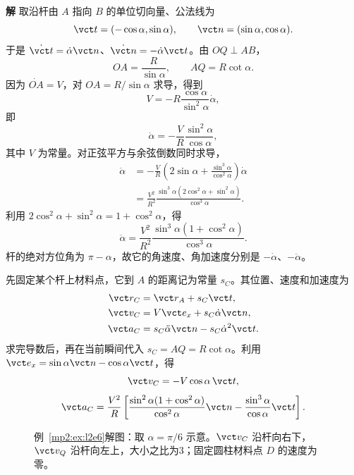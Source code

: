 \documentclass[11pt,openany,fontset=fandol]{ctexbook}
\theoremstyle{definition}\newtheorem{example}{例}[chapter]\newtheorem{exercise}{习题}[chapter]
\newcommand{\SolutionStart}{\par\medskip\ifdim\pagetotal>0pt\ifdim\dimexpr\pagegoal-\pagetotal\relax<3\baselineskip\newpage\fi\fi\noindent\textbf{解}\quad\ignorespaces}
\newenvironment{solution}{\SolutionStart}{\par\medskip}
\begin{document}
\begin{solution}
取沿杆由 $A$ 指向 $B$ 的单位切向量、公法线为
\[
\vct t=(-\cos\alpha,\sin\alpha),\qquad
\vct n=(\sin\alpha,\cos\alpha).
\]
于是 $\dot{\vct t}=\dot\alpha\vct n$、$\dot{\vct n}=-\dot\alpha\vct t$。由 $OQ\perp AB$，
\[
OA=\frac R{\sin\alpha},\qquad AQ=R\cot\alpha.
\]
因为 $\dot{OA}=V$，对 $OA=R/\sin\alpha$ 求导，得到
\[
V=-R\frac{\cos\alpha}{\sin^2\alpha}\dot\alpha,
\]
即
\[
\dot\alpha=-\frac VR\frac{\sin^2\alpha}{\cos\alpha},
\]
其中 $V$ 为常量。对正弦平方与余弦倒数同时求导，
\[
\begin{aligned}
\ddot\alpha
&=-\frac VR\left(2\sin\alpha+
\frac{\sin^3\alpha}{\cos^2\alpha}\right)\dot\alpha\\
&=\frac{V^2}{R^2}\frac{\sin^3\alpha(2\cos^2\alpha+\sin^2\alpha)}{\cos^3\alpha}.
\end{aligned}
\]
利用 $2\cos^2\alpha+\sin^2\alpha=1+\cos^2\alpha$，得
\[
\ddot\alpha=\frac{V^2}{R^2}
\frac{\sin^3\alpha(1+\cos^2\alpha)}{\cos^3\alpha}.
\]
杆的绝对方位角为 $\pi-\alpha$，故它的角速度、角加速度分别是 $-\dot\alpha$、$-\ddot\alpha$。

先固定某个杆上材料点，它到 $A$ 的距离记为常量 $s_C$。其位置、速度和加速度为
\begin{align*}
\vct r_C&=\vct r_A+s_C\vct t,\\
\vct v_C&=V\vct e_x+s_C\dot\alpha\vct n,\\
\vct a_C&=s_C\ddot\alpha\vct n-s_C\dot\alpha^2\vct t.
\end{align*}
求完导数后，再在当前瞬间代入 $s_C=AQ=R\cot\alpha$。利用
$\vct e_x=\sin\alpha\vct n-\cos\alpha\vct t$，得
\[
\vct v_C=-V\cos\alpha\,\vct t,
\]
\[
\vct a_C=\frac{V^2}{R}
\left[\frac{\sin^2\alpha(1+\cos^2\alpha)}{\cos^2\alpha}\vct n
-\frac{\sin^3\alpha}{\cos\alpha}\vct t\right].
\]

\begin{figure}[H]\centering
{}
\caption{例~\ref{mp2:ex:l2e6}解图：取 $\alpha=\pi/6$ 示意。$\vct v_C$ 沿杆向右下，$\vct v_Q$ 沿杆向左上，大小之比为3；固定圆柱材料点 $D$ 的速度为零。}\label{mp2:fig:l2e6-s}
\end{figure}


\end{solution}
\end{document}
